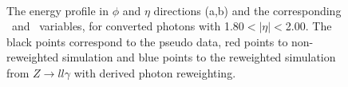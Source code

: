 \begin{figure}[htbp]
    \centering
	 \\
    \caption{The energy profile in $\phi$ and $\eta$ directions (a,b) and the corresponding \Rphi \ and \Reta \ variables, for converted photons with 1.80$<|\eta|<$2.00. The black points correspond to the pseudo data, red points to non-reweighted simulation and blue points to the reweighted simulation from $Z\rightarrow ll\gamma$ with derived photon reweighting.}
    \label{Photon:4}
\end{figure}

